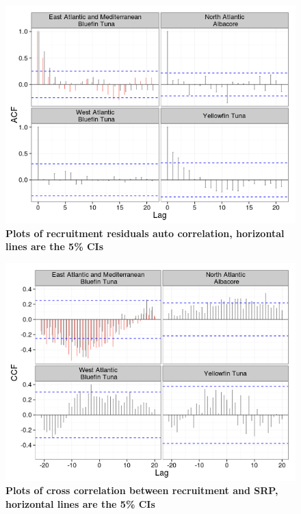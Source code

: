 \documentclass[a4paper, 10pt]{article}
\begin{document}
\begin{figure}[!ht]\begin{center} 
\includegraphics{figs/sr-acf-rsd.png}
\end{center}
\caption{\bf{Plots of recruitment residuals auto correlation, horizontal lines are the 5\% CIs}}
\label{acf2}\end{figure} 

\begin{figure}[!ht]\begin{center} 
\includegraphics{figs/sr-cc-sr2.png}
\end{center}
\caption{\bf{Plots of cross correlation between recruitment and SRP, horizontal lines are the 5\% CIs}}
\label{ccf}\end{figure} 
\end{document}
